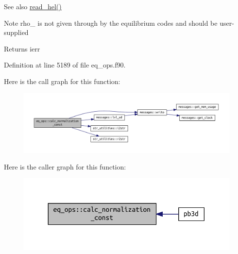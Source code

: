 \begin{DoxySeeAlso}{See also}
\hyperlink{namespacehelena__ops_ae05ba1182eb002d93c27ca4ff7ab8cf2}{read\+\_\+hel()}
\end{DoxySeeAlso}
\begin{DoxyNote}{Note}
{\ttfamily rho\+\_} is not given through by the equilibrium codes and should be user-\/supplied
\end{DoxyNote}
\begin{DoxyReturn}{Returns}
ierr 
\end{DoxyReturn}


Definition at line 5189 of file eq\+\_\+ops.\+f90.

Here is the call graph for this function\+:
\nopagebreak
\begin{figure}[H]
\begin{center}
\leavevmode
\includegraphics[width=350pt]{namespaceeq__ops_a7cd38586e386e1bc684a327ebcc4c1de_cgraph}
\end{center}
\end{figure}
Here is the caller graph for this function\+:
\nopagebreak
\begin{figure}[H]
\begin{center}
\leavevmode
\includegraphics[width=330pt]{namespaceeq__ops_a7cd38586e386e1bc684a327ebcc4c1de_icgraph}
\end{center}
\end{figure}
\mbox{\label{namespaceeq__ops_a9addef683b3d4a8c587510e4c994ec61}} 
